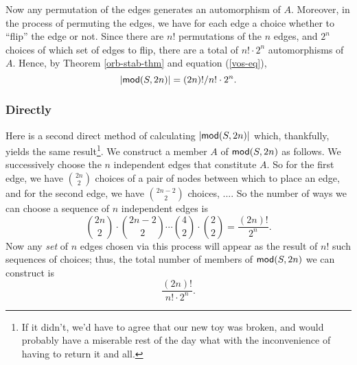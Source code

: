 Now any permutation of the edges generates an automorphism of $A$. Moreover, in the process of permuting the edges, we have for each edge a choice whether to ``flip'' the edge or not. Since there are $n!$ permutations of the $n$ edges, and $2^n$ choices of which set of edges to flip, there are a total of $n!\cdot 2^n$ automorphisms of $A$. Hence, by Theorem \ref{orb-stab-thm} and equation (\ref{vos-eq}), 
 \[
 \mbox{$|\mbox{$\mathsf {mod}(S,2n)$}|$}= (2n)!/n!\cdot 2^n.
 \]

\subsubsection*{Directly}
Here is a second direct method of calculating $\mbox{$|\mbox{$\mathsf {mod}(S,2n)$}|$}$ which, thankfully, yields the same result\footnote{If it didn't, we'd have to agree that our new toy was broken, and would probably have a miserable rest of the day what with the inconvenience of having to return it and all.}. We construct a member $A$ of $\mbox{$\mathsf {mod}(S,2n)$}$ as follows. We successively choose the $n$ independent edges that constitute $A$. So for the first edge, we have $\binom{2n}{2}$ choices of a pair of nodes between which to place an edge, and for the second edge, we have $\binom{2n-2}{2}$ choices, .... So the number of ways we can choose a sequence of $n$ independent edges is
\[
\binom{2n}{2}\cdot\binom{2n-2}{2}\cdots\binom{4}{2}\cdot\binom{2}{2}= \frac{(2n)!}{2^n}.
\]
Now any \emph{set} of $n$ edges chosen via this process will appear as the result of $n!$ such sequences of choices; thus, the total number of members of $\mbox{$\mathsf {mod}(S,2n)$}$ we can construct is 
\[
\frac{(2n)!}{n!\cdot 2^n}.
\]